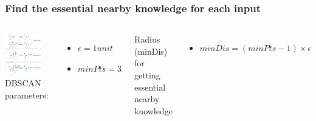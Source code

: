 \begin{frame}
    \frametitle{Find the essential nearby knowledge for each input}
    \begin{columns}
             \centering
             \includegraphics[width=0.8\textwidth]{resource/figures/context.png}
            DBSCAN parameters:
            \begin{itemize}
                \item $\epsilon = 1 unit$
                \item $minPts = 3$
            \end{itemize}
            \vspace{1cm}
            Radius (minDis) for getting \\essential nearby knowledge
            \begin{itemize}
                \item \small $minDis = (minPts - 1) \times \epsilon$
            \end{itemize}
    \end{columns}
\end{frame}

